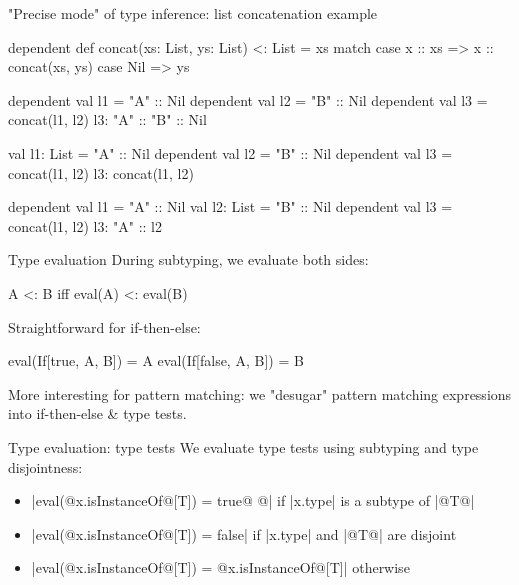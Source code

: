 \documentclass[10pt]{beamer}
\newenvironment{slide}[2][]
  {\begin{frame}[fragile,environment=slide,#1]{#2}}
  {\end{frame}}
\newcommand{\tp}[1]{\color{typeColor}#1}
\begin{document}
\begin{slide}{"Precise mode" of type inference: list concatenation example}
\begin{code}
dependent def concat(xs: List, ys: List) <: List =
  xs match
    case x :: xs => x :: concat(xs, ys)
    case Nil => ys
\end{code}
\begin{overprint}
\begin{code}
dependent val l1 = "A" :: Nil
dependent val l2 = "B" :: Nil
dependent val l3 = concat(l1, l2)
l3: { "A" :: "B" :: Nil }
\end{code}

\begin{code}
val l1: List     = "A" :: Nil
dependent val l2 = "B" :: Nil
dependent val l3 = concat(l1, l2)
l3: { concat(l1, l2) }
\end{code}

\begin{code}
dependent val l1 = "A" :: Nil
val l2: List     = "B" :: Nil
dependent val l3 = concat(l1, l2)
l3: { "A" :: l2 }
\end{code}

\end{overprint}
\end{slide}

\begin{slide}{Type evaluation}
During subtyping, we evaluate both sides:
\begin{code}
A <: B  iff  eval(A) <: eval(B)
\end{code}
\pause

Straightforward for if-then-else:
\begin{code}
eval(If[true,  A, B]) = A
eval(If[false, A, B]) = B
\end{code}
\pause

More interesting for pattern matching: we "desugar" pattern matching expressions into if-then-else \& type tests.
\end{slide}
\begin{slide}{Type evaluation: type tests}
We evaluate type tests using subtyping and type disjointness:
\begin{itemize}
  \item |eval(@\tp{x.isInstanceOf}@[T]) = true@ @| \quad if |x.type| is a subtype of |@\tp{T}@|
  \item |eval(@\tp{x.isInstanceOf}@[T]) = false| \quad if |x.type| and |@\tp{T}@| are disjoint
  \item |eval(@\tp{x.isInstanceOf}@[T]) = @\tp{x.isInstanceOf}@[T]| \quad otherwise
\end{itemize}
\end{slide}
\end{document}
